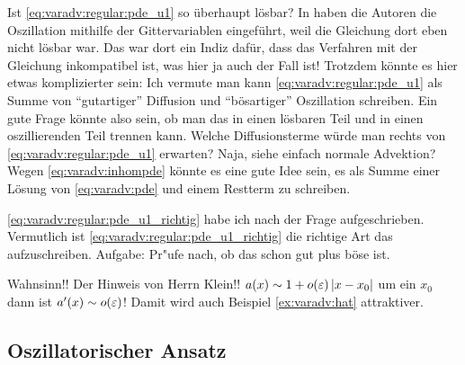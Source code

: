 \begin{frage}
Ist \eqref{eq:varadv:regular:pde_u1} so überhaupt lösbar?
In \cite{Junk2004} haben die Autoren die Oszillation mithilfe der Gittervariablen eingeführt, weil die Gleichung dort eben nicht lösbar war.
Das war dort ein Indiz dafür, dass das Verfahren mit der Gleichung inkompatibel ist, was hier ja auch der Fall ist!
Trotzdem könnte es hier etwas komplizierter sein: Ich vermute man kann \eqref{eq:varadv:regular:pde_u1} als Summe von ``gutartiger'' Diffusion und ``bösartiger'' Oszillation schreiben.
Ein gute Frage könnte also sein, ob man das in einen lösbaren Teil und in einen oszillierenden Teil trennen kann.
Welche Diffusionsterme würde man rechts von \eqref{eq:varadv:regular:pde_u1} erwarten? Naja, siehe einfach normale Advektion?
Wegen \eqref{eq:varadv:inhompde} könnte es eine gute Idee sein, es als Summe einer Lösung von \eqref{eq:varadv:pde} und einem Restterm zu schreiben.
\end{frage}

\begin{bemerkung}
\eqref{eq:varadv:regular:pde_u1_richtig} habe ich nach der Frage aufgeschrieben.
Vermutlich ist \eqref{eq:varadv:regular:pde_u1_richtig} die richtige Art das aufzuschreiben. Aufgabe: Pr"ufe nach, ob das schon gut plus böse ist.
\end{bemerkung}

\begin{bemerkung}
Wahnsinn!! Der Hinweis von Herrn Klein!! $a(x) \sim 1 + o(\varepsilon)\left| x-x_0 \right|$ um ein $x_0$ dann ist $a'(x) \sim o(\varepsilon)$!
Damit wird auch Beispiel \ref{ex:varadv:hat} attraktiver.
\end{bemerkung}



\subsection{Oszillatorischer Ansatz}


